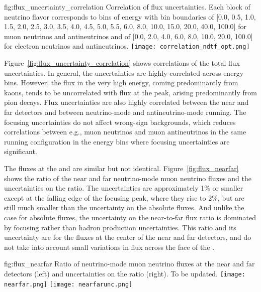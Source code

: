 \begin{dunefigure}{fig:flux_uncertainty_correlation}
{Correlation of flux uncertainties.  Each block of neutrino flavor corresponds to bins of energy with bin boundaries of [0.0, 0.5, 1.0, 1.5, 2.0, 2.5, 3.0, 3.5, 4.0, 4.5, 5.0, 5.5, 6.0, 8.0, 10.0, 15.0, 20.0, 40.0, 100.0] for muon neutrinos and antineutrinos and of [0.0, 2.0, 4.0, 6.0, 8.0, 10.0, 20.0, 100.0] for electron neutrinos and antineutrinos. }
    \texttt{[image: correlation\_ndtf\_opt.png]}\end{dunefigure}

Figure~\ref{fig:flux_uncertainty_correlation} shows correlations of the total flux uncertainties.  In general, the uncertainties are highly correlated across energy bins. However, the flux in the very high energy, coming predominantly from kaons, tends to be uncorrelated with flux at the peak, %
arising predominantly from pion decays.  Flux uncertainties are also highly correlated between the near and far detectors and between neutrino-mode and antineutrino-mode running.  The focusing uncertainties do not affect wrong-sign backgrounds, which reduces correlations between e.g., muon neutrinos and muon antineutrinos in the same running configuration in the energy bins where focusing uncertainties are significant.    

The fluxes at the  and  are similar but not identical. Figure~\ref{fig:flux_nearfar} shows the ratio of the near and far neutrino-mode muon neutrino fluxes %
and the uncertainties on the ratio.  The uncertainties are approximately 1\% or smaller except at the falling edge of the focusing peak, where they rise to 2\%, but are still much smaller than the uncertainty on the absolute fluxes.    And unlike the case for absolute fluxes, the uncertainty on the near-to-far flux ratio is dominated by focusing rather than hadron production uncertainties.  This ratio and its uncertainty are for the fluxes at the center of the near and far detectors,
and do not take into account small variations in flux across the face of the .     

\begin{dunefigure}{fig:flux_nearfar}
{Ratio of neutrino-mode muon neutrino fluxes at the near and far detectors (left) and uncertainties on the ratio (right).  To be updated. }
    \texttt{[image: nearfar.png]}
     \texttt{[image: nearfarunc.png]}
\end{dunefigure}

